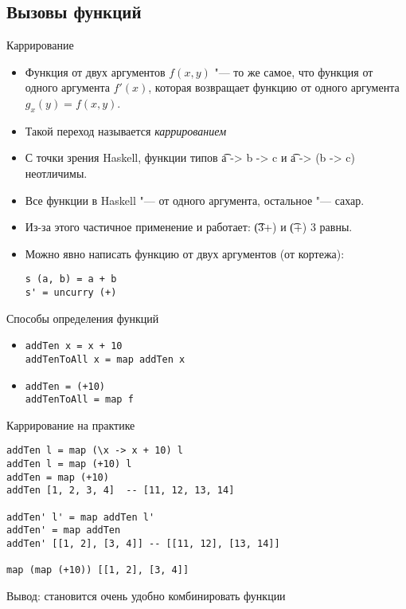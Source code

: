 \subsection{Вызовы функций}

\begin{frame}
\end{frame}

\begin{frame}[fragile]{Каррирование}
	\begin{itemize}
		\item Функция от двух аргументов $f(x, y)$ "--- то же самое, что функция от одного аргумента $f'(x)$,
			которая возвращает функцию от одного аргумента $g_x(y)=f(x, y)$.
		\item Такой переход называется \textit{каррированием}
		\item С точки зрения Haskell, функции типов \t{a -> b -> c} и \t{a -> (b -> c)} неотличимы.
		\item Все функции в Haskell "--- от одного аргумента, остальное "--- сахар.
		\item Из-за этого частичное применение и работает: \t{(3+)} и \t{(+) 3} равны.
		\item Можно явно написать функцию от двух аргументов (от кортежа):
\begin{verbatim}
s (a, b) = a + b
s' = uncurry (+)
\end{verbatim}
	\end{itemize}
\end{frame}

\begin{frame}[fragile]{Способы определения функций}
	\begin{itemize}
		\item
\begin{verbatim}
addTen x = x + 10
addTenToAll x = map addTen x
\end{verbatim}
		\item
\begin{verbatim}
addTen = (+10)
addTenToAll = map f
\end{verbatim}
	\end{itemize}
\end{frame}

\begin{frame}[fragile]{Каррирование на практике}
	\begin{verbatim}
addTen l = map (\x -> x + 10) l
addTen l = map (+10) l
addTen = map (+10)
addTen [1, 2, 3, 4]  -- [11, 12, 13, 14]

addTen' l' = map addTen l'
addTen' = map addTen
addTen' [[1, 2], [3, 4]] -- [[11, 12], [13, 14]]

map (map (+10)) [[1, 2], [3, 4]]
	\end{verbatim}
	Вывод: становится очень удобно комбинировать функции
\end{frame}


